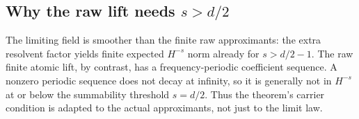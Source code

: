 \subsection{Why the raw lift needs $s>d/2$}
The limiting field is smoother than the finite raw approximants: the extra resolvent factor yields finite expected $H^{-s}$ norm already for $s>d/2-1$. The raw finite atomic lift, by contrast, has a frequency-periodic coefficient sequence. A nonzero periodic sequence does not decay at infinity, so it is generally not in $H^{-s}$ at or below the summability threshold $s=d/2$. Thus the theorem's carrier condition is adapted to the actual approximants, not just to the limit law.

